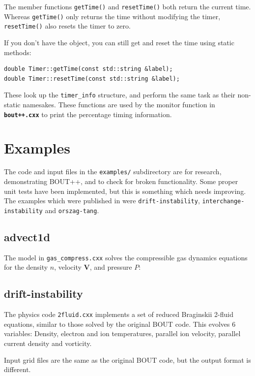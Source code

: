\documentclass[12pt]{article}
\newcommand{\file}[1]{\texttt{\bf #1}}
\begin{document}
The member functions
%
\lstinline!getTime()! and \lstinline!resetTime()!
%
both return the current time. Whereas
%
\lstinline!getTime()!
%
 only returns the time without modifying the timer,
%
\lstinline!resetTime()!
%
 also resets the timer to zero.

If you don't have the object, you can still get and reset the time using static
methods:
%
\begin{lstlisting}
double Timer::getTime(const std::string &label);
double Timer::resetTime(const std::string &label);
\end{lstlisting}
%
These look up the
%
\lstinline!timer_info!
%
 structure, and perform the same task as their non-static namesakes. These
 functions are used by the monitor function in \file{bout++.cxx} to print the
 percentage timing information.





\section{Examples}
%
\label{sec:examples}
%
The code and input files in the \texttt{examples/} subdirectory are for
research, demonstrating BOUT++, and to check for broken functionality. Some
proper unit tests have been implemented, but this is something which needs
improving. The examples which were published in
\cite{Dudson2009,dudson-2008-arxiv} were \texttt{drift-instability},
\texttt{interchange-instability} and \texttt{orszag-tang}.



\subsection{advect1d}
%
The model in \texttt{gas\_compress.cxx} solves the compressible gas dynamics
equations for the density $n$, velocity $\mathbf{V}$, and pressure $P$:



\subsection{drift-instability}
%
The physics code \texttt{2fluid.cxx} implements a set of reduced Braginskii
2-fluid equations, similar to those solved by the original BOUT code.  This
evolves 6 variables: Density, electron and ion temperatures, parallel ion
velocity, parallel current density and vorticity.

Input grid files are the same as the original BOUT code, but the output format
is different.
\end{document}
